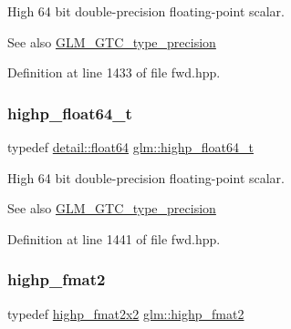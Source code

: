 High 64 bit double-\/precision floating-\/point scalar. \begin{DoxySeeAlso}{See also}
\hyperlink{group__gtc__type__precision}{G\+L\+M\+\_\+\+G\+T\+C\+\_\+type\+\_\+precision} 
\end{DoxySeeAlso}


Definition at line 1433 of file fwd.\+hpp.

\mbox{\label{group__gtc__type__precision_gae8b3b2ace5be2a61c6bf63f12643fa15}} 
\subsubsection{\texorpdfstring{highp\+\_\+float64\+\_\+t}{highp\_float64\_t}}
{\footnotesize\ttfamily typedef \hyperlink{namespaceglm_1_1detail_a5a0a9a1be3fd5dbe6d47ae45c3022b06}{detail\+::float64} \hyperlink{group__gtc__type__precision_gae8b3b2ace5be2a61c6bf63f12643fa15}{glm\+::highp\+\_\+float64\+\_\+t}}

High 64 bit double-\/precision floating-\/point scalar. \begin{DoxySeeAlso}{See also}
\hyperlink{group__gtc__type__precision}{G\+L\+M\+\_\+\+G\+T\+C\+\_\+type\+\_\+precision} 
\end{DoxySeeAlso}


Definition at line 1441 of file fwd.\+hpp.

\mbox{\label{group__gtc__type__precision_ga10d47be18a81c111a8706d0a6df5b4ea}} 
\subsubsection{\texorpdfstring{highp\+\_\+fmat2}{highp\_fmat2}}
{\footnotesize\ttfamily typedef \hyperlink{group__gtc__type__precision_gaeb76f1230ecfd4c80635d3c618405e31}{highp\+\_\+fmat2x2} \hyperlink{group__gtc__type__precision_ga10d47be18a81c111a8706d0a6df5b4ea}{glm\+::highp\+\_\+fmat2}}

